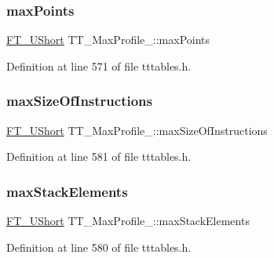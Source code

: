 \mbox{\label{struct_t_t___max_profile___a218fa149a195e9afa1738ef5aef07aa1}} 
\subsubsection{\texorpdfstring{maxPoints}{maxPoints}}
{\footnotesize\ttfamily \mbox{\hyperlink{fttypes_8h_a937f6c17cf5ffd09086d8610c37b9f58}{F\+T\+\_\+\+U\+Short}} T\+T\+\_\+\+Max\+Profile\+\_\+\+::max\+Points}



Definition at line 571 of file tttables.\+h.

\mbox{\label{struct_t_t___max_profile___ac458411198b09d303ec8ae206e6926b6}} 
\subsubsection{\texorpdfstring{maxSizeOfInstructions}{maxSizeOfInstructions}}
{\footnotesize\ttfamily \mbox{\hyperlink{fttypes_8h_a937f6c17cf5ffd09086d8610c37b9f58}{F\+T\+\_\+\+U\+Short}} T\+T\+\_\+\+Max\+Profile\+\_\+\+::max\+Size\+Of\+Instructions}



Definition at line 581 of file tttables.\+h.

\mbox{\label{struct_t_t___max_profile___a2df9b9ff2a5a9daaa7c3d40fe024637f}} 
\subsubsection{\texorpdfstring{maxStackElements}{maxStackElements}}
{\footnotesize\ttfamily \mbox{\hyperlink{fttypes_8h_a937f6c17cf5ffd09086d8610c37b9f58}{F\+T\+\_\+\+U\+Short}} T\+T\+\_\+\+Max\+Profile\+\_\+\+::max\+Stack\+Elements}



Definition at line 580 of file tttables.\+h.


